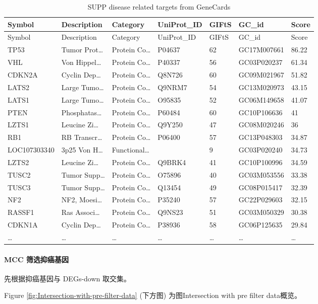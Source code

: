 \documentclass[
]{article}
\begin{document}
\begin{longtable}[]{@{}lllllll@{}}
\caption{\label{tab:SUPP-disease-related-targets-from-GeneCards}SUPP disease related targets from GeneCards}\tabularnewline
\toprule
Symbol & Description & Category & UniProt\_ID & GIFtS & GC\_id & Score\tabularnewline
\midrule
\endfirsthead
\toprule
Symbol & Description & Category & UniProt\_ID & GIFtS & GC\_id & Score\tabularnewline
\midrule
\endhead
TP53 & Tumor Prot\ldots{} & Protein Co\ldots{} & P04637 & 62 & GC17M007661 & 86.22\tabularnewline
VHL & Von Hippel\ldots{} & Protein Co\ldots{} & P40337 & 56 & GC03P020237 & 61.34\tabularnewline
CDKN2A & Cyclin Dep\ldots{} & Protein Co\ldots{} & Q8N726 & 60 & GC09M021967 & 51.82\tabularnewline
LATS2 & Large Tumo\ldots{} & Protein Co\ldots{} & Q9NRM7 & 54 & GC13M020973 & 43.15\tabularnewline
LATS1 & Large Tumo\ldots{} & Protein Co\ldots{} & O95835 & 52 & GC06M149658 & 41.07\tabularnewline
PTEN & Phosphatas\ldots{} & Protein Co\ldots{} & P60484 & 60 & GC10P106636 & 41\tabularnewline
LZTS1 & Leucine Zi\ldots{} & Protein Co\ldots{} & Q9Y250 & 47 & GC08M020246 & 36\tabularnewline
RB1 & RB Transcr\ldots{} & Protein Co\ldots{} & P06400 & 57 & GC13P048303 & 34.87\tabularnewline
LOC107303340 & 3p25 Von H\ldots{} & Functional\ldots{} & & 9 & GC03P020240 & 34.73\tabularnewline
LZTS2 & Leucine Zi\ldots{} & Protein Co\ldots{} & Q9BRK4 & 41 & GC10P100996 & 34.59\tabularnewline
TUSC2 & Tumor Supp\ldots{} & Protein Co\ldots{} & O75896 & 40 & GC03M053556 & 33.38\tabularnewline
TUSC3 & Tumor Supp\ldots{} & Protein Co\ldots{} & Q13454 & 49 & GC08P015417 & 32.39\tabularnewline
NF2 & NF2, Moesi\ldots{} & Protein Co\ldots{} & P35240 & 57 & GC22P029603 & 32.15\tabularnewline
RASSF1 & Ras Associ\ldots{} & Protein Co\ldots{} & Q9NS23 & 51 & GC03M050329 & 30.38\tabularnewline
CDKN1A & Cyclin Dep\ldots{} & Protein Co\ldots{} & P38936 & 58 & GC06P125635 & 29.84\tabularnewline
\ldots{} & \ldots{} & \ldots{} & \ldots{} & \ldots{} & \ldots{} & \ldots{}\tabularnewline
\bottomrule
\end{longtable}

\hypertarget{mcc-ux7b5bux9009ux6291ux764cux57faux56e0}{%
\paragraph{MCC 筛选抑癌基因}\label{mcc-ux7b5bux9009ux6291ux764cux57faux56e0}}

先根据抑癌基因与 DEGs-down 取交集。

Figure \ref{fig:Intersection-with-pre-filter-data} (下方图) 为图Intersection with pre filter data概览。
\end{document}
